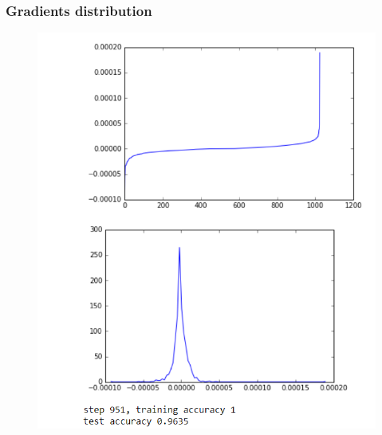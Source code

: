 \begin{frame}

    \frametitle{Gradients distribution}
    \begin{figure}
		\includegraphics[scale=0.28]{figure/951-2.PNG}
    \end{figure}
\end{frame}


